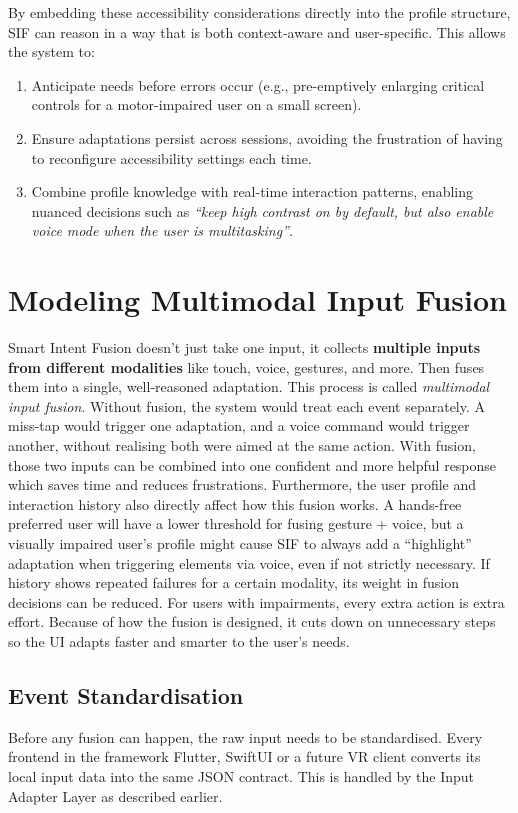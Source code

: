 \documentclass[openany]{book}
\begin{document}
By embedding these accessibility considerations directly into the profile structure, SIF can reason in a way that is both context-aware and user-specific. This allows the system to:
\begin{enumerate}
    \item Anticipate needs before errors occur (e.g., pre-emptively enlarging critical controls for a motor-impaired user on a small screen).
    \item Ensure adaptations persist across sessions, avoiding the frustration of having to reconfigure accessibility settings each time.
    \item Combine profile knowledge with real-time interaction patterns, enabling nuanced decisions such as \emph{“keep high contrast on by default, but also enable voice mode when the user is multitasking”}.
\end{enumerate}

\section{Modeling Multimodal Input Fusion}
Smart Intent Fusion doesn’t just take one input, it collects \textbf{multiple inputs from different modalities} like touch, voice, gestures, and more. Then fuses them into a single, well-reasoned adaptation. This process is called \textit{multimodal input fusion}.
Without fusion, the system would treat each event separately. A miss-tap would trigger one adaptation, and a voice command would trigger another, without realising both were aimed at the same action. With fusion, those two inputs can be combined into one confident and more helpful response which saves time and reduces frustrations. Furthermore, the user profile and interaction history also directly affect how this fusion works. A hands-free preferred user will have a lower threshold for fusing gesture + voice, but a visually impaired user’s profile might cause SIF to always add a “highlight” adaptation when triggering elements via voice, even if not strictly necessary. If history shows repeated failures for a certain modality, its weight in fusion decisions can be reduced. For users with impairments, every extra action is extra effort. Because of how the fusion is designed, it cuts down on unnecessary steps so the UI adapts faster and smarter to the user’s needs.

\subsection{Event Standardisation}
Before any fusion can happen, the raw input needs to be standardised.
Every frontend in the framework Flutter, SwiftUI or a future VR client converts its local input data into the same JSON contract. This is handled by the Input Adapter Layer as described earlier.
\end{document}
